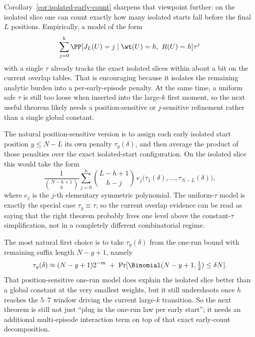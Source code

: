 Corollary~\ref{cor:isolated-early-count} sharpens that viewpoint further: on the isolated slice one can count exactly
how many isolated starts fall before the final \(L\) positions. Empirically, a model of the form
\[
\sum_{j=0}^h
\PP[J_L(U)=j\mid \wt(U)=h,\ R(U)=h]\tau^j
\]
with a single \(\tau\) already tracks the exact isolated slices within about a bit on the current overlap tables.
That is encouraging because it isolates the remaining analytic burden into a per-early-episode penalty.
At the same time, a uniform safe \(\tau\) is still too loose when inserted into the large-\(k\) first moment, so the
next useful theorem likely needs a position-sensitive or \(j\)-sensitive refinement rather than a single global
constant.

The natural position-sensitive version is to assign each early isolated start position \(y\le N-L\) its own
penalty \(\tau_y(\delta)\), and then average the product of those penalties over the exact isolated-start
configuration. On the isolated slice this would take the form
\[
\frac{1}{\binom{N-h+1}{h}}
\sum_{j=0}^h
\binom{L-h+1}{h-j}\,
e_j\!\bigl(\tau_1(\delta),\dots,\tau_{N-L}(\delta)\bigr),
\]
where \(e_j\) is the \(j\)-th elementary symmetric polynomial. The uniform-\(\tau\) model is exactly the special case
\(\tau_y\equiv \tau\), so the current overlap evidence can be read as saying that the right theorem probably lives one
level above the constant-\(\tau\) simplification, not in a completely different combinatorial regime.

The most natural first choice is to take \(\tau_y(\delta)\) from the one-run bound with remaining suffix length
\(N-y+1\), namely
\[
\tau_y(\delta)
\approx
(N-y+1)2^{-m}
\;+\;
\Pr[\Binomial(N-y+1,\tfrac12)\le \delta N].
\]
That position-sensitive one-run model does explain the isolated slice better than a global constant at the very
smallest weights, but it still undershoots once \(h\) reaches the \(5\text{--}7\) window driving the current
large-\(k\) transition. So the next theorem is still not just ``plug in the one-run law per early start''; it needs
an additional multi-episode interaction term on top of that exact early-count decomposition.

